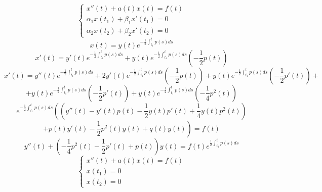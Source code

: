 \begin{block}
  $$
  \left\{
  \begin{array}{l}
    x''(t) + a(t)x(t) = f(t) \\
    \alpha_1 x(t_1) + \beta_1 x'(t_1) = 0 \\
    \alpha_2 x(t_2) + \beta_2 x'(t_2) = 0
  \end{array}
  \right.
  $$
  $$
  x(t) = y(t) e^{-\frac{1}{2} \int_{t_1}^t p(s)ds}
  $$
  $$
  x'(t) = y'(t) e^{-\frac{1}{2} \int_{t_1}^t p(s)ds}
    +
    y(t) e^{-\frac{1}{2} \int_{t_1}^t p(s)ds}\left(-\frac{1}{2}p(t)\right)
  $$
  $$
  x'(t) = y''(t) e^{-\frac{1}{2} \int_{t_1}^t p(s)ds}
    +
    2 y'(t) e^{-\frac{1}{2} \int_{t_1}^t p(s)ds}\left(-\frac{1}{2}p(t)\right)
    +
    y(t) e^{-\frac{1}{2} \int_{t_1}^t p(s)ds}\left(-\frac{1}{2}p'(t)\right)
    +
  $$
  $$
    +
    y(t) e^{-\frac{1}{2} \int_{t_1}^t p(s)ds}\left(-\frac{1}{2}p'(t)\right)
    +
    y(t) e^{-\frac{1}{2} \int_{t_1}^t p(s)ds}\left(-\frac{1}{4}p^2(t)\right)
  $$
  $$
  e^{-\frac{1}{2} \int_{t_1}^t p(s)ds}
  \left(
    \left(
      y''(t) - y'(t) p(t) - \frac{1}{2}y(t)p'(t) + \frac{1}{4}y(t) p^2(t)
    \right)
  \right.
  $$
  $$
  \left.
    +
    p(t)y'(t) - \frac{1}{2}p^2(t) y(t) + q(t)y(t)
  \right)
  = f(t)
  $$
  $$
  y''(t) +
  \left(
    -\frac{1}{4} p^2(t) - \frac{1}{2}p'(t) + p(t)
  \right)
  y(t) = f(t) e^{\frac{1}{2} \int_{t_1}^t p(s) ds}
  $$
  $$
  \left\{
  \begin{array}{l}
    x''(t) + a(t)x(t) = f(t) \\
    x(t_1) = 0 \\
    x(t_2) = 0
  \end{array}
  \right.
  $$
\end{block}
